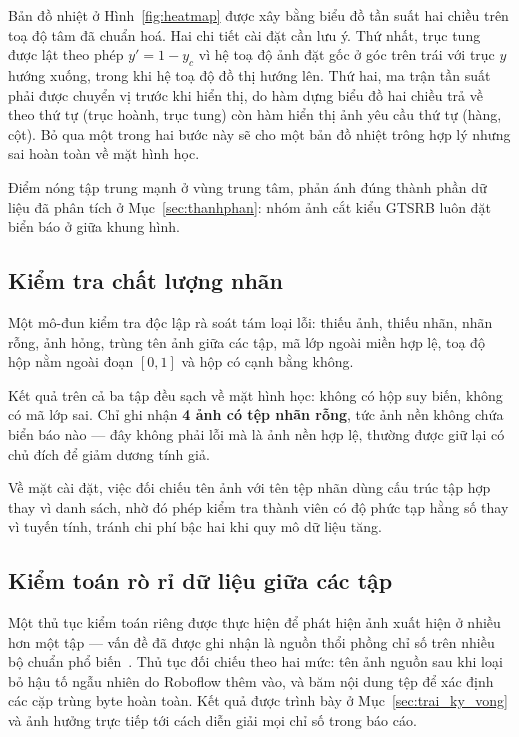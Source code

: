Bản đồ nhiệt ở Hình~\ref{fig:heatmap} được xây bằng biểu đồ tần suất hai chiều trên toạ độ tâm đã
chuẩn hoá. Hai chi tiết cài đặt cần lưu ý. Thứ nhất, trục tung được lật theo phép $y' = 1 - y_c$ vì
hệ toạ độ ảnh đặt gốc ở góc trên trái với trục $y$ hướng xuống, trong khi hệ toạ độ đồ thị hướng
lên. Thứ hai, ma trận tần suất phải được chuyển vị trước khi hiển thị, do hàm dựng biểu đồ hai
chiều trả về theo thứ tự (trục hoành, trục tung) còn hàm hiển thị ảnh yêu cầu thứ tự (hàng, cột).
Bỏ qua một trong hai bước này sẽ cho một bản đồ nhiệt trông hợp lý nhưng sai hoàn toàn về mặt hình
học.

Điểm nóng tập trung mạnh ở vùng trung tâm, phản ánh đúng thành phần dữ liệu đã phân tích ở
Mục~\ref{sec:thanhphan}: nhóm ảnh cắt kiểu GTSRB luôn đặt biển báo ở giữa khung hình.

\subsection{Kiểm tra chất lượng nhãn}

Một mô-đun kiểm tra độc lập rà soát tám loại lỗi: thiếu ảnh, thiếu nhãn, nhãn rỗng, ảnh hỏng, trùng
tên ảnh giữa các tập, mã lớp ngoài miền hợp lệ, toạ độ hộp nằm ngoài đoạn $[0,1]$ và hộp có cạnh
bằng không.

Kết quả trên cả ba tập đều sạch về mặt hình học: không có hộp suy biến, không có mã lớp sai. Chỉ
ghi nhận \textbf{4 ảnh có tệp nhãn rỗng}, tức ảnh nền không chứa biển báo nào --- đây không phải lỗi
mà là ảnh nền hợp lệ, thường được giữ lại có chủ đích để giảm dương tính giả.

Về mặt cài đặt, việc đối chiếu tên ảnh với tên tệp nhãn dùng cấu trúc tập hợp thay vì danh sách,
nhờ đó phép kiểm tra thành viên có độ phức tạp hằng số thay vì tuyến tính, tránh chi phí bậc hai
khi quy mô dữ liệu tăng.

\subsection{Kiểm toán rò rỉ dữ liệu giữa các tập}
\label{sec:kiem_toan_ro_ri}

Một thủ tục kiểm toán riêng được thực hiện để phát hiện ảnh xuất hiện ở nhiều hơn một tập --- vấn đề
đã được ghi nhận là nguồn thổi phồng chỉ số trên nhiều bộ chuẩn phổ biến~\cite{barz2020duplicates}.
Thủ tục đối chiếu theo hai mức: tên ảnh nguồn sau khi loại bỏ hậu tố ngẫu nhiên do Roboflow thêm
vào, và băm nội dung tệp để xác định các cặp trùng byte hoàn toàn. Kết quả được trình bày ở
Mục~\ref{sec:trai_ky_vong} và ảnh hưởng trực tiếp tới cách diễn giải mọi chỉ số trong báo cáo.

